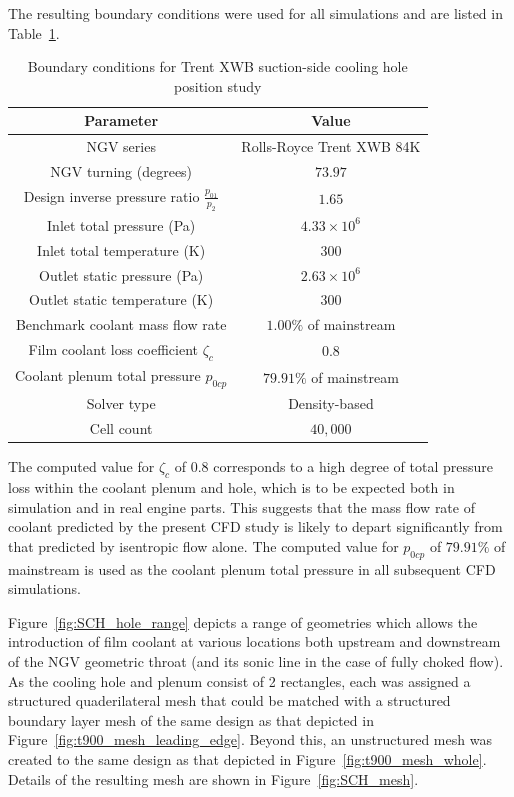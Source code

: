 \documentclass[a4paper, 11pt, oneside]{report}
\begin{document}
The resulting boundary conditions were used for all simulations and are listed in Table~\ref{SCH_parameters}.

\begin{table}[H]
\caption{Boundary conditions for Trent XWB suction-side cooling hole position study}
\label{SCH_parameters}
\begin{center}
\begin{tabular}{|c|c|}
\hline
Parameter & Value\\
\hline
NGV series & Rolls-Royce Trent XWB 84K\\
NGV turning (degrees) & $73.97$\\
Design inverse pressure ratio $\frac{p_{01}}{p_2}$ & $1.65$\\
Inlet total pressure (Pa) & $4.33 \times 10^6$\\
Inlet total temperature (K) & $300$\\
Outlet static pressure (Pa) & $2.63 \times 10^6$\\
Outlet static temperature (K) & $300$\\
Benchmark coolant mass flow rate & $1.00\%$ of mainstream\\
Film coolant loss coefficient $\zeta_c$ & $0.8$\\
Coolant plenum total pressure $p_{0cp}$ & $79.91\%$ of mainstream\\
Solver type & Density-based\\
Cell count & $40,000$\\
\hline
\end{tabular}
\end{center}
\end{table}

The computed value for $\zeta_c$ of $0.8$ corresponds to a high degree of total pressure loss within the coolant plenum and hole, which is to be expected both in simulation and in real engine parts. This suggests that the mass flow rate of coolant predicted by the present CFD study is likely to depart significantly from that predicted by isentropic flow alone. The computed value for $p_{0cp}$ of $79.91\%$ of mainstream is used as the coolant plenum total pressure in all subsequent CFD simulations.

Figure~\ref{fig:SCH_hole_range} depicts a range of geometries which allows the introduction of film coolant at various locations both upstream and downstream of the NGV geometric throat (and its sonic line in the case of fully choked flow). As the cooling hole and plenum consist of 2 rectangles, each was assigned a structured quaderilateral mesh that could be matched with a structured boundary layer mesh of the same design as that depicted in Figure~\ref{fig:t900_mesh_leading_edge}. Beyond this, an unstructured mesh was created to the same design as that depicted in Figure~\ref{fig:t900_mesh_whole}. Details of the resulting mesh are shown in Figure~\ref{fig:SCH_mesh}.
\end{document}
